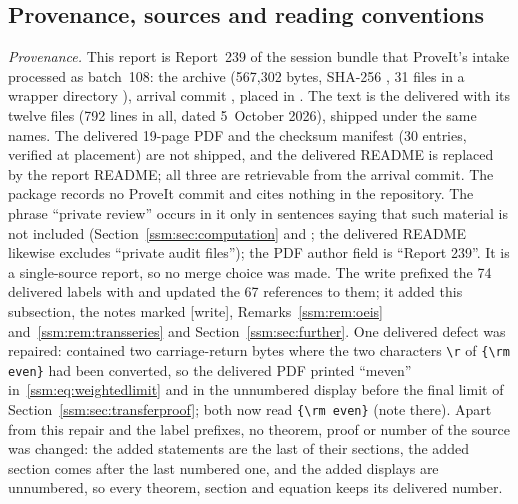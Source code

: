 \subsection{Provenance, sources and reading conventions}\label{ssm:sec:provenance}
\begin{writenote}
\emph{Provenance.} This report is Report~239 of the session bundle that
ProveIt's  intake processed as batch~108: the archive
 (567{,}302 bytes, SHA-256
, 31 files in a wrapper directory
), arrival commit , placed in
. The text is the delivered  with its
twelve files  (792 lines in all, dated 5~October
2026), shipped under the same names. The delivered 19-page PDF and the
checksum manifest  (30 entries, verified at
placement) are not shipped, and the delivered README is replaced by the
report README; all three are retrievable from the arrival commit. The
package records no ProveIt commit and cites nothing in the repository. The
phrase ``private review'' occurs in it only in sentences saying that such
material is not included (Section~\ref{ssm:sec:computation} and
; the delivered README likewise excludes ``private audit
files''); the PDF author field is ``Report 239''. It is a single-source
report, so no merge choice was made. The write prefixed the 74 delivered
labels with  and updated the 67 references to them; it added
this subsection, the notes marked [write], Remarks~\ref{ssm:rem:oeis}
and~\ref{ssm:rem:transseries} and Section~\ref{ssm:sec:further}. One
delivered defect was repaired:  contained two
carriage-return bytes where the two characters \verb|\r| of
\verb|{\rm even}| had been converted, so the delivered PDF printed
``meven'' in~\eqref{ssm:eq:weightedlimit} and in the unnumbered display
before the final limit of Section~\ref{ssm:sec:transferproof}; both now
read \verb|{\rm even}| (note there). Apart from this repair and the label
prefixes, no theorem, proof or number of the source was changed: the added statements are the last of their sections,
the added section comes after the last numbered one, and the added displays
are unnumbered, so every theorem, section and equation keeps its delivered
number.


\end{writenote}
